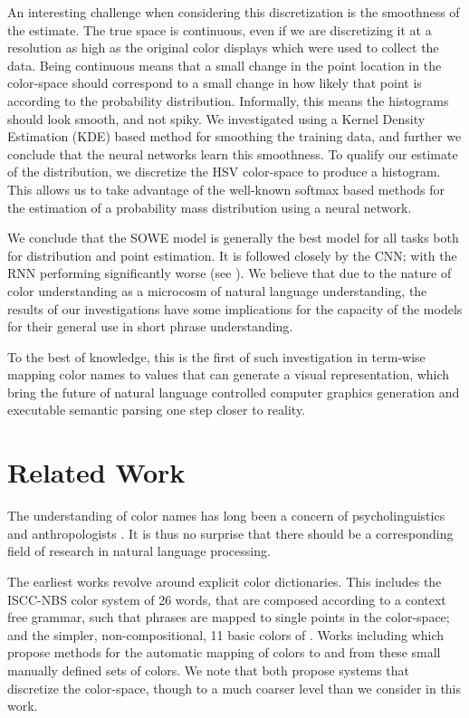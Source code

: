 \documentclass[]{clv3}
\newcommand{\parencite}{\citep}
\newcommand{\textcite}{\citet}
\newcommand{\datapairs}{$\langle\text{color-name},\,(h,s,v)\rangle$}
\begin{document}
An interesting challenge when considering this discretization is the smoothness of the estimate.
The true space is continuous, even if we are discretizing it at a resolution as high as the original color displays which were used to collect the data.
Being continuous means that a small change in the point location in the color-space should correspond to a small change in how likely that point is according to the probability distribution.
Informally, this means the histograms should look smooth, and not spiky.
We investigated using a Kernel Density Estimation (KDE) based method for smoothing the training data, and further we conclude that the neural networks learn this smoothness.
To qualify our estimate of the distribution, we discretize the HSV color-space to produce a histogram.
This allows us to take advantage of the well-known softmax based methods for the estimation of a probability mass distribution using a neural network.


We conclude that the SOWE model is generally the best model for all tasks both for distribution and point estimation.
It is followed closely by the CNN; with the RNN performing significantly worse (see ).
We believe that due to the nature of color understanding as a microcosm of natural language understanding, the results of our investigations have some implications for the capacity of the models for their general use in short phrase understanding.

To the best of knowledge, this is the first of such investigation in term-wise mapping color names to values that can generate a visual representation, which bring the future of natural language controlled computer graphics generation and executable semantic parsing one step closer to reality.  


\section{Related Work}\label{sec:related-work}
The understanding of color names has long been a concern of psycholinguistics and anthropologists \parencite{berlin1969basic,heider1972universals,HEIDER1972337,mylonas2015use}.
It is thus no surprise that there should be a corresponding field of research in natural language processing.

The earliest works revolve around explicit color dictionaries.
This includes the ISCC-NBS color system \parencite{kelly1955iscc} of 26 words, that are composed according to a context free grammar, such that phrases are mapped to single points in the color-space;
and the simpler, non-compositional, 11 basic colors of \textcite{berlin1969basic}.
Works including \textcite{Berk:1982:HFS:358589.358606,conway1992experimental,ele1994computational, mojsilovic2005computational, menegaz2007discrete,van2009learning} which propose methods for the automatic mapping of colors to and from these small manually defined sets of colors.
We note that \textcite{menegaz2007discrete,van2009learning} both propose systems that discretize the color-space, though to a much coarser level than we consider in this work.
\end{document}
